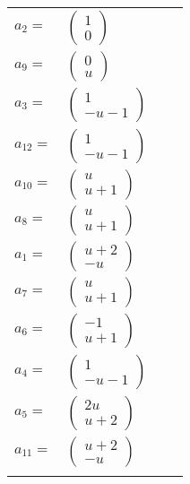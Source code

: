 \documentclass[1p]{elsarticle_modified}
\theoremstyle{definition}
\begin{document}
\begin{tabular}{m{7pt} m{180pt} m{7pt} m{180pt} }
\flushright $a_{2}=$&$\begin{pmatrix}1\\0\end{pmatrix}$ \\
\flushright $a_{9}=$&$\begin{pmatrix}0\\u\end{pmatrix}$ \\
\flushright $a_{3}=$&$\begin{pmatrix}1\\- u-1\end{pmatrix}$ \\
\flushright $a_{12}=$&$\begin{pmatrix}1\\- u-1\end{pmatrix}$ \\
\flushright $a_{10}=$&$\begin{pmatrix}u\\u+1\end{pmatrix}$ \\
\flushright $a_{8}=$&$\begin{pmatrix}u\\u+1\end{pmatrix}$ \\
\flushright $a_{1}=$&$\begin{pmatrix}u+2\\- u\end{pmatrix}$ \\
\flushright $a_{7}=$&$\begin{pmatrix}u\\u+1\end{pmatrix}$ \\
\flushright $a_{6}=$&$\begin{pmatrix}-1\\u+1\end{pmatrix}$ \\
\flushright $a_{4}=$&$\begin{pmatrix}1\\- u-1\end{pmatrix}$ \\
\flushright $a_{5}=$&$\begin{pmatrix}2 u\\u+2\end{pmatrix}$ \\
\flushright $a_{11}=$&$\begin{pmatrix}u+2\\- u\end{pmatrix}$\\&\end{tabular}
\end{document}

